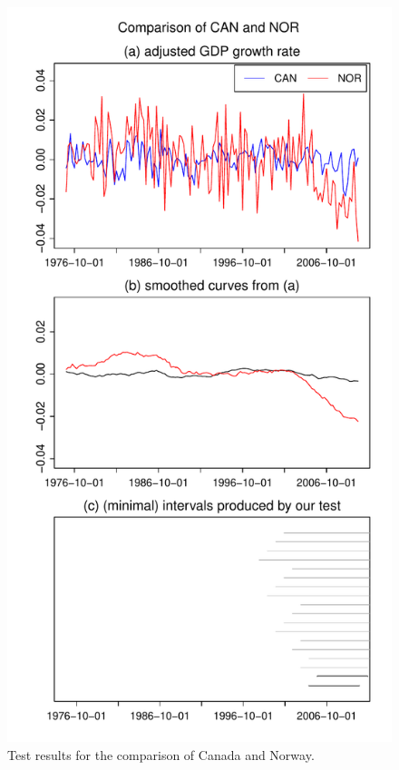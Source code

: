 \documentclass[a4paper,12pt]{article}
\begin{document}
\begin{figure}[t!]
\begin{minipage}[t]{0.49\textwidth}
\includegraphics[width=\textwidth]{Plots/gdp/CAN_vs_NOR}
\caption{Test results for the comparison of Canada and Norway.}\label{fig:Canada:Norway}
\end{minipage}
\hspace{0.25cm}

\end{figure}
\end{document}
